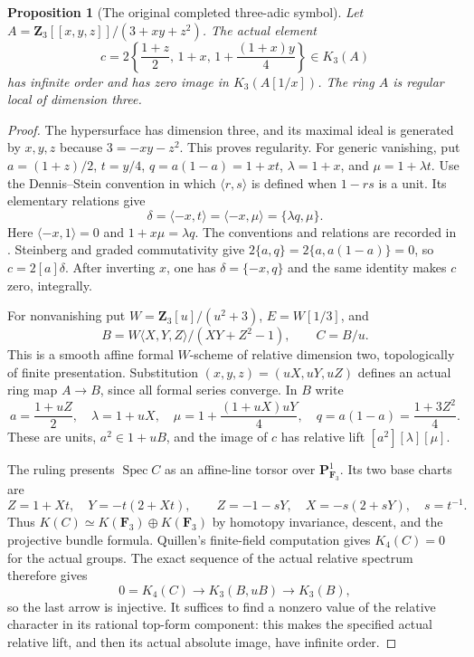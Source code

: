 \documentclass[11pt,a4paper]{article}
\newtheorem{proposition}[theorem]{Proposition}
\theoremstyle{remark}
\begin{document}
\begin{proposition}[The original completed three-adic symbol]
\label{prop:directtcoriginal}
Let $A=\mathbf Z_3[[x,y,z]]/(3+xy+z^2)$. The actual element
\[
 c=2\left\{\frac{1+z}{2},\,1+x,\,
                        1+\frac{(1+x)y}{4}\right\}\in K_3(A)
\]
has infinite order and has zero image in $K_3(A[1/x])$.
The ring $A$ is regular local of dimension three.
\end{proposition}
\begin{proof}
The hypersurface has dimension three, and its maximal ideal is
generated by $x,y,z$ because $3=-xy-z^2$. This proves regularity.
For generic vanishing, put $a=(1+z)/2$, $t=y/4$,
$q=a(1-a)=1+xt$, $\lambda=1+x$, and $\mu=1+\lambda t$.
Use the Dennis--Stein convention in which $\langle r,s\rangle$
is defined when $1-rs$ is a unit. Its elementary relations give
\[
 \delta=\langle-x,t\rangle=\langle-x,\mu\rangle
          =\{\lambda q,\mu\}.
\]
Here $\langle-x,1\rangle=0$ and $1+x\mu=\lambda q$.
The conventions and relations are recorded in
\cite[III, Definition~5.11 and (D1)--(D3)]{Weibel}.
Steinberg and graded commutativity give
$2\{a,q\}=2\{a,a(1-a)\}=0$, so $c=2[a]\delta$.
After inverting $x$, one has $\delta=\{-x,q\}$ and the same
identity makes $c$ zero, integrally.

For nonvanishing put $W=\mathbf Z_3[u]/(u^2+3)$, $E=W[1/3]$, and
\[
 B=W\langle X,Y,Z\rangle/(XY+Z^2-1),\qquad C=B/u.
\]
This is a smooth affine formal $W$-scheme of relative dimension two,
topologically of finite presentation. Substitution
$(x,y,z)=(uX,uY,uZ)$ defines an actual ring map $A\to B$, since all
formal series converge. In $B$ write
\[
 a=\frac{1+uZ}{2},\quad \lambda=1+uX,\quad
 \mu=1+\frac{(1+uX)uY}{4},\quad
 q=a(1-a)=\frac{1+3Z^2}{4}.
\]
These are units, $a^2\in1+uB$, and the image of $c$ has relative lift
$[a^2][\lambda][\mu]$.

The ruling presents $\operatorname{Spec}C$ as an affine-line torsor
over $\mathbf P^1_{\mathbf F_3}$. Its two base charts are
\[
 Z=1+Xt,\quad Y=-t(2+Xt),\qquad
 Z=-1-sY,\quad X=-s(2+sY),\quad s=t^{-1}.
\]
Thus $K(C)\simeq K(\mathbf F_3)\oplus K(\mathbf F_3)$ by homotopy
invariance, descent, and the projective bundle formula. Quillen's
finite-field computation gives $K_4(C)=0$ for the actual groups.
The exact sequence of the actual relative spectrum therefore gives
\[
 0=K_4(C)\longrightarrow K_3(B,uB)\longrightarrow K_3(B),
\]
so the last arrow is injective. It suffices to find a nonzero value
of the relative character in its rational top-form component:
this makes the specified actual relative lift, and then its actual
absolute image, have infinite order.


\end{proof}
\end{document}
